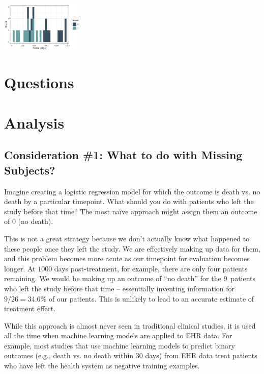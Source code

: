 \begin{center}
\includegraphics[width=0.3\textwidth]{img/cs-ovarian-futime.png}
\end{center}

\section{Questions}

\section{Analysis}





\subsection{Consideration \#1: What to do with Missing Subjects?}

Imagine creating a logistic regression model for which the outcome is death vs. no death by a particular timepoint. What should you do with patients who left the study before that time? The most na\"ive approach might assign them an outcome of 0 (no death). 

This is not a great strategy because we don't actually know what happened to these people once they left the study. We are effectively making up data for them, and this problem becomes more acute as our timepoint for evaluation becomes longer. At $1000$ days post-treatment, for example, there are only four patients remaining. We would be making up an outcome of ``no death'' for the $9$~patients who left the study before that time -- essentially inventing information for $9/26 = 34.6$\% of our patients. This is unlikely to lead to an accurate estimate of treatment effect.

While this approach is almost never seen in traditional clinical studies, it is used all the time when machine learning models are applied to EHR data. For example, most studies that use machine learning models to predict binary outcomes (e.g., death vs. no death within 30 days) from EHR data treat patients who have left the health system as negative training examples.

